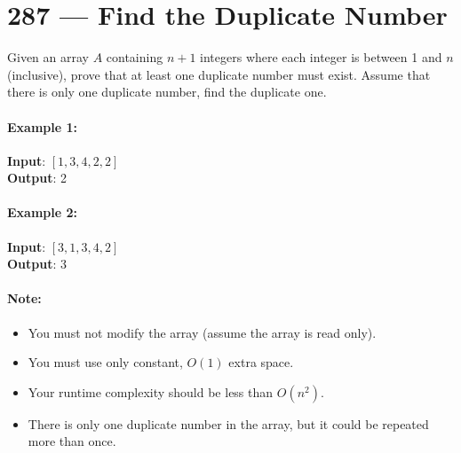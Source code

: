 \section{287 --- Find the Duplicate Number}
Given an array $A$ containing $n + 1$ integers where each integer is between 1 and $n$ (inclusive), prove that at least one duplicate number must exist. Assume that there is only one duplicate number, find the duplicate one.

\paragraph{Example 1:}
\begin{flushleft}
\textbf{Input}: $[1,3,4,2,2]$
\\
\textbf{Output}: 2
\end{flushleft}

\paragraph{Example 2:}
\begin{flushleft}
\textbf{Input}: $[3,1,3,4,2]$
\\
\textbf{Output}: 3
\end{flushleft}

\paragraph{Note:}
\begin{itemize}
\item You must not modify the array (assume the array is read only).
\item You must use only constant, $O(1)$ extra space.
\item Your runtime complexity should be less than $O(n^2)$.
\item There is only one duplicate number in the array, but it could be repeated more than once.
\end{itemize}
